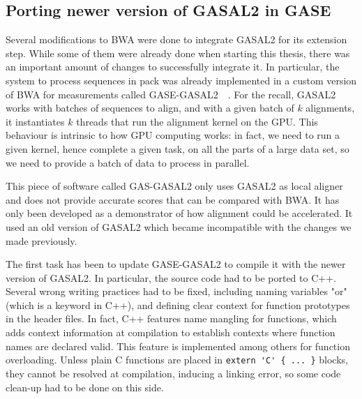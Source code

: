 \subsection{Porting newer version of GASAL2 in GASE}

Several modifications to BWA were done to integrate GASAL2 for its extension step. While some of them were already done when starting this thesis, there was an important amount of changes to successfully integrate it. In particular, the system to process sequences in pack was already implemented in a custom version of BWA for measurements called GASE-GASAL2~\cite{Ahmed:gase-gasal2}~\cite{Ahmed:GASE}. For the recall, GASAL2 works with batches of sequences to align, and with a given batch of $k$ alignments, it instantiates $k$ threads that run the alignment kernel on the GPU. This behaviour is intrinsic to how GPU computing works: in fact, we need to run a given kernel, hence complete a given task, on all the parts of a large data set, so we need to provide a batch of data to process in parallel.

This piece of software called GAS-GASAL2 only uses GASAL2 as local aligner and does not provide accurate scores that can be compared with BWA. It has only been developed as a demonstrator of how alignment could be accelerated. It used an old version of GASAL2 which became incompatible with the changes we made previously.

The first task has been to update GASE-GASAL2 to compile it with the newer version of GASAL2. In particular, the source code had to be ported to C++. Several wrong writing practices had to be fixed, including naming variables "or" (which is a keyword in C++), and defining clear context for function prototypes in the header files. In fact, C++ features name mangling for functions, which adds context information at compilation to establish contexts where function names are declared valid. This feature is implemented among others for function overloading. Unless plain C functions are placed in \verb|extern 'C' { ... }| blocks, they cannot be resolved at compilation, inducing a linking error, so some code clean-up had to be done on this side.